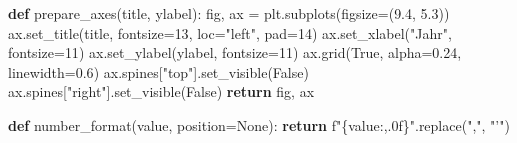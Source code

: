 \documentclass[
  ngerman,
  a4paper,
  DIV=11,
  oneside]{scrreprt}
\newenvironment{Shaded}{\begin{snugshade}}{\end{snugshade}}
\newcommand{\ControlFlowTok}[1]{\textcolor[rgb]{0.00,0.23,0.31}{\textbf{#1}}}
\newcommand{\DecValTok}[1]{\textcolor[rgb]{0.68,0.00,0.00}{#1}}
\newcommand{\FloatTok}[1]{\textcolor[rgb]{0.68,0.00,0.00}{#1}}
\newcommand{\KeywordTok}[1]{\textcolor[rgb]{0.00,0.23,0.31}{\textbf{#1}}}
\newcommand{\NormalTok}[1]{\textcolor[rgb]{0.00,0.23,0.31}{#1}}
\newcommand{\OperatorTok}[1]{\textcolor[rgb]{0.37,0.37,0.37}{#1}}
\newcommand{\SpecialCharTok}[1]{\textcolor[rgb]{0.37,0.37,0.37}{#1}}
\newcommand{\SpecialStringTok}[1]{\textcolor[rgb]{0.13,0.47,0.30}{#1}}
\newcommand{\StringTok}[1]{\textcolor[rgb]{0.13,0.47,0.30}{#1}}
\newcommand{\VariableTok}[1]{\textcolor[rgb]{0.07,0.07,0.07}{#1}}
\begin{document}
\begin{Shaded}
\begin{Highlighting}[]
\KeywordTok{def}\NormalTok{ prepare\_axes(title, ylabel):}
\NormalTok{    fig, ax }\OperatorTok{=}\NormalTok{ plt.subplots(figsize}\OperatorTok{=}\NormalTok{(}\FloatTok{9.4}\NormalTok{, }\FloatTok{5.3}\NormalTok{))}
\NormalTok{    ax.set\_title(title, fontsize}\OperatorTok{=}\DecValTok{13}\NormalTok{, loc}\OperatorTok{=}\StringTok{"left"}\NormalTok{, pad}\OperatorTok{=}\DecValTok{14}\NormalTok{)}
\NormalTok{    ax.set\_xlabel(}\StringTok{"Jahr"}\NormalTok{, fontsize}\OperatorTok{=}\DecValTok{11}\NormalTok{)}
\NormalTok{    ax.set\_ylabel(ylabel, fontsize}\OperatorTok{=}\DecValTok{11}\NormalTok{)}
\NormalTok{    ax.grid(}\VariableTok{True}\NormalTok{, alpha}\OperatorTok{=}\FloatTok{0.24}\NormalTok{, linewidth}\OperatorTok{=}\FloatTok{0.6}\NormalTok{)}
\NormalTok{    ax.spines[}\StringTok{"top"}\NormalTok{].set\_visible(}\VariableTok{False}\NormalTok{)}
\NormalTok{    ax.spines[}\StringTok{"right"}\NormalTok{].set\_visible(}\VariableTok{False}\NormalTok{)}
    \ControlFlowTok{return}\NormalTok{ fig, ax}


\KeywordTok{def}\NormalTok{ number\_format(value, position}\OperatorTok{=}\VariableTok{None}\NormalTok{):}
    \ControlFlowTok{return} \SpecialStringTok{f"}\SpecialCharTok{\{}\NormalTok{value}\SpecialCharTok{:,.0f\}}\SpecialStringTok{"}\NormalTok{.replace(}\StringTok{","}\NormalTok{, }\StringTok{"’"}\NormalTok{)}



\end{Highlighting}
\end{Shaded}
\end{document}
